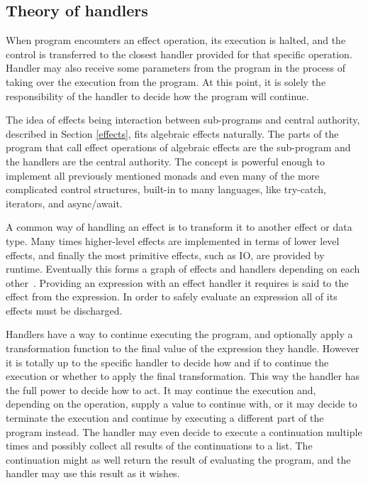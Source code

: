 \subsection{Theory of handlers}
When program encounters an effect operation, its execution is halted, and the control is transferred to the closest handler provided for that specific operation. Handler may also receive some parameters from the program in the process of taking over the execution from the program. At this point, it is solely the responsibility of the handler to decide how the program will continue.

The idea of effects being interaction between sub-programs and central authority, described in Section \ref{effects}, fits algebraic effects naturally. The parts of the program that call effect operations of algebraic effects are the sub-program and the handlers are the central authority.  The concept is powerful enough to implement all previously mentioned monads and even many of the more complicated control structures, built-in to many languages, like try-catch, iterators, and async/await.~\cite{alg-effs-for-fp}

A common way of handling an effect is to transform it to another effect or data type. Many times higher-level effects are implemented in terms of lower level effects, and finally the most primitive effects, such as IO, are provided by runtime. Eventually this forms a graph of effects and handlers depending on each other~\cite{intro-to-alg-eff}. Providing an expression with an effect handler it requires is said to  the effect from the expression. In order to safely evaluate an expression all of its effects must be discharged.

Handlers have a way to continue executing the program, and optionally apply a transformation function to the final value of the expression they handle. However it is totally up to the specific handler to decide how and if to continue the execution or whether to apply the final transformation. This way the handler has the full power to decide how to act. It may continue the execution and, depending on the operation, supply a value to continue with, or it may decide to terminate the execution and continue by executing a different part of the program instead. The handler may even decide to execute a continuation multiple times and possibly collect all results of the continuations to a list. The continuation might as well return the result of evaluating the program, and the handler may use this result as it wishes.

